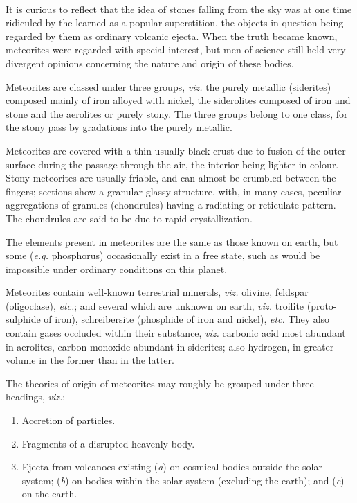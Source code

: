 \documentclass[a4paper, 12pt, oneside]{article}
\begin{document}
\paragraph{}
It is curious to reflect that the idea of stones falling from the sky was at one time ridiculed by the learned as a popular superstition, the objects in question being regarded by them as ordinary volcanic ejecta. When the truth became known, meteorites were regarded with special interest, but men of science still held very divergent opinions concerning the nature and origin of these bodies.

Meteorites are classed under three groups, \emph{viz.} the purely metallic (siderites) composed mainly of iron alloyed with nickel, the siderolites composed of iron and stone and the aerolites or purely stony. The three groups belong to one class, for the stony pass by gradations into the purely metallic.

Meteorites are covered with a thin usually black crust due to fusion of the outer surface during the passage through the air, the interior being lighter in colour. Stony meteorites are usually friable, and can almost be crumbled between the fingers; sections show a granular glassy structure, with, in many cases, peculiar aggregations of granules (chondrules) having a radiating or reticulate pattern. The chondrules are said to be due to rapid crystallization.

The elements present in meteorites are the same as those known on earth, but some (\emph{e.g.} phosphorus) occasionally exist in a free state, such as would be impossible under ordinary conditions on this planet.

Meteorites contain well-known terrestrial minerals, \emph{viz.} olivine, feldspar (oligoclase), \emph{etc.}; and several which are unknown on earth, \emph{viz.} troilite (proto-sulphide of iron), schreibersite (phosphide of iron and nickel), \emph{etc.} They also contain gases occluded within their substance, \emph{viz.} carbonic acid most abundant in aerolites, carbon monoxide abundant in siderites; also hydrogen, in greater volume in the former than in the latter.

The theories of origin of meteorites may roughly be grouped under three headings, \emph{viz.}:
\begin{enumerate}
    \item Accretion of particles.
    \item Fragments of a disrupted heavenly body.
    \item Ejecta from volcanoes existing (\emph{a}) on cosmical bodies outside the solar system; (\emph{b}) on bodies within the solar system (excluding the earth); and (\emph{c}) on the earth.
\end{enumerate}
\end{document}
